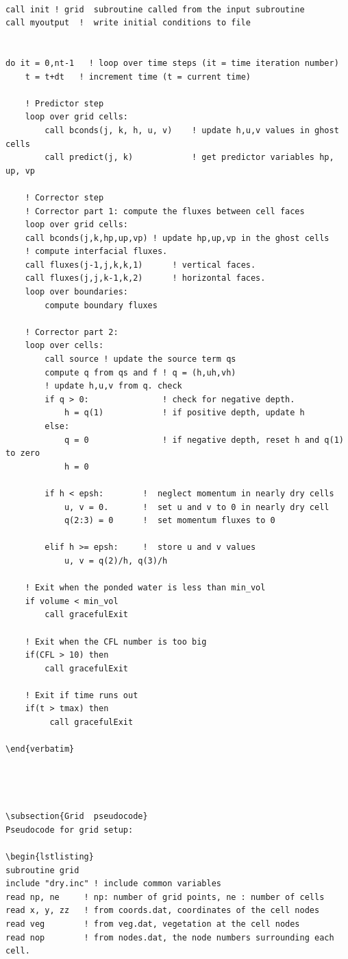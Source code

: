 \documentclass{article}
\begin{document}
\begin{lstlisting}
 
call init ! grid  subroutine called from the input subroutine
call myoutput  !  write initial conditions to file


do it = 0,nt-1   ! loop over time steps (it = time iteration number)
	t = t+dt   ! increment time (t = current time)

	! Predictor step
	loop over grid cells: 
		call bconds(j, k, h, u, v)    ! update h,u,v values in ghost cells
		call predict(j, k)            ! get predictor variables hp, up, vp

    ! Corrector step
	! Corrector part 1: compute the fluxes between cell faces
	loop over grid cells: 			  
    call bconds(j,k,hp,up,vp) ! update hp,up,vp in the ghost cells
    ! compute interfacial fluxes. 
    call fluxes(j-1,j,k,k,1)      ! vertical faces. 
    call fluxes(j,j,k-1,k,2)      ! horizontal faces.
	loop over boundaries:
		compute boundary fluxes
	
	! Corrector part 2: 
	loop over cells:
		call source ! update the source term qs
		compute q from qs and f	! q = (h,uh,vh)
		! update h,u,v from q. check 
	    if q > 0:				! check for negative depth.	
			h = q(1) 		    ! if positive depth, update h
	    else:
			q = 0 				! if negative depth, reset h and q(1) to zero
			h = 0					  
	
	    if h < epsh: 		!  neglect momentum in nearly dry cells
			u, v = 0.		!  set u and v to 0 in nearly dry cell	  
			q(2:3) = 0 		!  set momentum fluxes to 0
	    
	    elif h >= epsh:		!  store u and v values
	    	u, v = q(2)/h, q(3)/h
		    
    ! Exit when the ponded water is less than min_vol    
    if volume < min_vol
    	call gracefulExit
    	
    ! Exit when the CFL number is too big
    if(CFL > 10) then
        call gracefulExit
        
	! Exit if time runs out
    if(t > tmax) then
         call gracefulExit
            
\end{verbatim}




\subsection{Grid  pseudocode}
Pseudocode for grid setup: 

\begin{lstlisting}
subroutine grid
include "dry.inc" ! include common variables 
read np, ne 	! np: number of grid points, ne : number of cells
read x, y, zz	! from coords.dat, coordinates of the cell nodes
read veg        ! from veg.dat, vegetation at the cell nodes	
read nop		! from nodes.dat, the node numbers surrounding each cell.


\end{lstlisting}
\end{document}
